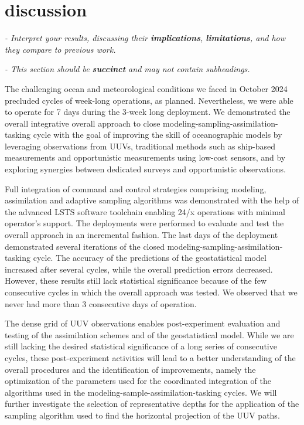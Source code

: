 \section{discussion}

\textit{- Interpret your results, discussing their \textbf{implications}, \textbf{limitations}, and how they compare to previous work.}

\textit{- This section should be \textbf{succinct} and may not contain subheadings.}

The challenging ocean and meteorological conditions we faced in October 2024 precluded cycles of week-long operations, as planned. Nevertheless, we were able to operate for 7 days during the 3-week long deployment.  
We demonstrated the overall integrative overall approach to close modeling-sampling-assimilation-tasking cycle with the goal of improving the skill of oceanographic models by leveraging observations from UUVs, traditional methods such as ship-based measurements and opportunistic measurements using low-cost sensors, and by exploring synergies between dedicated surveys and opportunistic observations.

Full integration of command and control strategies comprising modeling, assimilation and adaptive sampling algorithms was demonstrated with the help of the advanced LSTS software toolchain enabling 24/x operations with minimal operator’s support.
The deployments were performed to evaluate and test the overall approach in an incremental fashion. The last days of the deployment demonstrated several iterations of the closed modeling-sampling-assimilation-tasking cycle. The accuracy of the predictions of the geostatistical model increased after several cycles, while the overall prediction errors decreased. However, these results still lack statistical significance because of the few consecutive cycles in which the overall approach was tested. We observed that we never had more than 3 consecutive days of operation.

The dense grid of UUV observations enables post-experiment evaluation and testing of the assimilation schemes and of the geostatistical model. While we are still lacking the desired statistical significance of a long series of consecutive cycles, these post-experiment activities will lead to a better understanding of the overall procedures and the identification of improvements, namely the optimization of the parameters used for the coordinated integration of the algorithms used in the modeling-sample-assimilation-tasking cycles. We will further investigate the selection of representative depths for the application of the sampling algorithm used to find the horizontal projection of the UUV paths.

